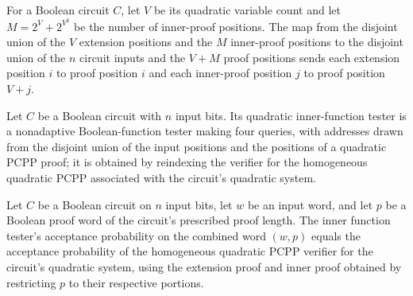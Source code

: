 \begin{definition}
\label{FABL.BooleanCircuit.circuitQuadraticInnerVerifierAddress}
\leanok
{}
For a Boolean circuit $C$, let $V$ be its quadratic variable count and let
$M=2^V+2^{V^2}$ be the number of inner-proof positions. The map from the disjoint union
of the $V$ extension positions and the $M$ inner-proof positions to the disjoint union
of the $n$ circuit inputs and the $V+M$ proof positions sends each extension position
$i$ to proof position $i$ and each inner-proof position $j$ to proof position $V+j$.
\end{definition}

\begin{definition}
\label{FABL.BooleanCircuit.circuitQuadraticInnerFunctionTester}
\leanok
{}
Let $C$ be a Boolean circuit with $n$ input bits. Its quadratic inner-function tester is
a nonadaptive Boolean-function tester making four queries, with addresses drawn from the
disjoint union of the input positions and the positions of a quadratic PCPP proof; it is
obtained by reindexing the verifier for the homogeneous quadratic PCPP associated with
the circuit’s quadratic system.
\end{definition}

\begin{theorem}
\label{FABL.BooleanCircuit.circuitQuadraticInnerFunctionTester_acceptanceProbability}
\leanok
{}
Let $C$ be a Boolean circuit on $n$ input bits, let $w$ be an input word, and let $p$ be
a Boolean proof word of the circuit’s prescribed proof length. The inner function
tester’s acceptance probability on the combined word $(w,p)$ equals the acceptance
probability of the homogeneous quadratic PCPP verifier for the circuit’s quadratic
system, using the extension proof and inner proof obtained by restricting $p$ to their
respective portions.
\end{theorem}

